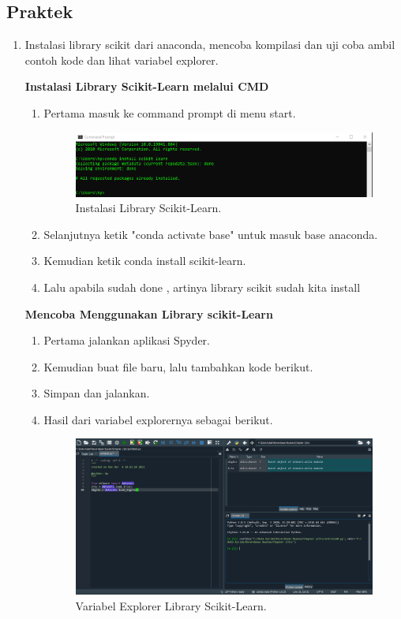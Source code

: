 \subsection{Praktek}
\begin{enumerate}
	\item Instalasi  library  scikit  dari  anaconda,  mencoba  kompilasi  dan  uji  coba  ambil contoh kode dan lihat variabel explorer.
	
	\textbf{Instalasi Library Scikit-Learn melalui CMD }
	\begin{enumerate}
		\item Pertama masuk ke command prompt di menu start.
		\begin{figure}[H]
			\includegraphics[width=1\textwidth]{figures/1184077/chapter1/praktek/1.PNG}
			\centering
			\caption{Instalasi Library Scikit-Learn.}
		\end{figure}
		\item Selanjutnya ketik "conda activate base" untuk masuk base anaconda.
		\item Kemudian ketik conda install scikit-learn.
		\item Lalu apabila sudah done , artinya library scikit sudah kita install
	\end{enumerate}

	\textbf{Mencoba Menggunakan Library scikit-Learn}
	\begin{enumerate}
		\item Pertama jalankan aplikasi Spyder.
		\item Kemudian buat file baru, lalu tambahkan kode berikut.
		
		\item Simpan dan jalankan.
		\item Hasil dari variabel explorernya sebagai berikut.
		\begin{figure}[H]
			\includegraphics[width=1\textwidth]{figures/1184077/chapter1/praktek/contoh.PNG}
			\centering
			\caption{Variabel Explorer Library Scikit-Learn.}
		\end{figure}
	\end{enumerate}
	

\end{enumerate}
